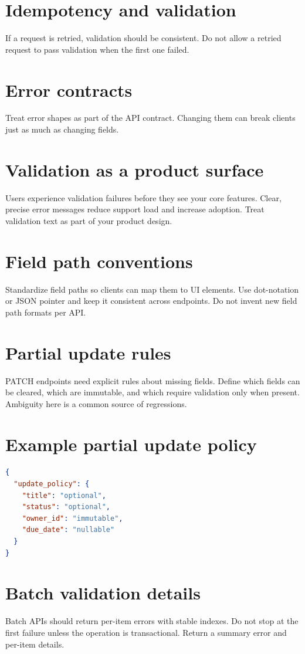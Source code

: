 \section{Idempotency and validation}
If a request is retried, validation should be consistent.
Do not allow a retried request to pass validation when the first one failed.

\section{Error contracts}
Treat error shapes as part of the API contract.
Changing them can break clients just as much as changing fields.

\section{Validation as a product surface}
Users experience validation failures before they see your core features.
Clear, precise error messages reduce support load and increase adoption.
Treat validation text as part of your product design.

\section{Field path conventions}
Standardize field paths so clients can map them to UI elements.
Use dot-notation or JSON pointer and keep it consistent across endpoints.
Do not invent new field path formats per API.

\section{Partial update rules}
PATCH endpoints need explicit rules about missing fields.
Define which fields can be cleared, which are immutable, and which require validation only when present.
Ambiguity here is a common source of regressions.

\section{Example partial update policy}
\begin{lstlisting}[language=JSON]
{
  "update_policy": {
    "title": "optional",
    "status": "optional",
    "owner_id": "immutable",
    "due_date": "nullable"
  }
}
\end{lstlisting}

\section{Batch validation details}
Batch APIs should return per-item errors with stable indexes.
Do not stop at the first failure unless the operation is transactional.
Return a summary error and per-item details.

